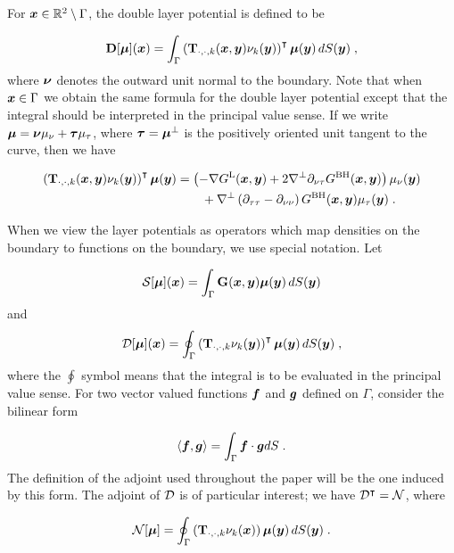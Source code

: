 For ${\boldsymbol x} \in \mathbb{R}^2 \setminus \Gamma$, the double layer
potential is defined to be

\begin{equation} \label{eq:doublelayer}
  {\bf D} [{\boldsymbol \mu}] ({\boldsymbol x}) = \int_\Gamma \left ( {\bf T}_{\cdot,\cdot,k}({\boldsymbol x},{\boldsymbol y})
  \nu_k({\boldsymbol y})\right )^\intercal {\boldsymbol \mu}({\boldsymbol y}) \, dS({\boldsymbol y}) \; ,
\end{equation}
where ${\boldsymbol \nu}$ denotes the outward unit normal to the boundary.
Note that when ${\boldsymbol x} \in \Gamma$ we obtain the same formula
for the double layer potential except that the integral should be
interpreted in the principal value sense. 
If we write ${\boldsymbol \mu} = {\boldsymbol \nu} \mu_\nu + {\boldsymbol \tau} \mu_\tau$,
where ${\boldsymbol \tau} = {\boldsymbol \mu}^\bot$ is the positively oriented unit
tangent to the curve, then we have

\begin{align} \label{eq:stokesdlkernel}
  \left ( {\bf T}_{\cdot,\cdot,k}({\boldsymbol x},{\boldsymbol y})\nu_k({\boldsymbol y}) \right )^\intercal
  {\boldsymbol \mu}({\boldsymbol y}) &= \left ( - \nabla G^{\textrm{L}}({\boldsymbol x},{\boldsymbol y}) + 2 \nabla^\bot
  \partial_{\nu\tau} G^{\textrm{BH}}({\boldsymbol x},{\boldsymbol y}) \right ) \mu_\nu({\boldsymbol y}) \nonumber \\
  & \qquad+
  \nabla^\bot \left (\partial_{\tau\tau}-\partial_{\nu\nu} \right )
  G^{\textrm{BH}}({\boldsymbol x},{\boldsymbol y}) \mu_\tau({\boldsymbol y}) \; .
\end{align}

When we view the layer potentials as
operators which map densities on the boundary to functions
on the boundary, we use special notation. Let

\begin{equation}
  {\mathcal S} [{\boldsymbol \mu}] ({\boldsymbol x}) = \int_\Gamma {\bf G} ({\boldsymbol x},{\boldsymbol y}) {\boldsymbol \mu}({\boldsymbol y})
  \, dS({\boldsymbol y})
\end{equation}
and
\begin{equation}
  {\mathcal D} [{\boldsymbol \mu}] ({\boldsymbol x}) = \oint_\Gamma \left ( {\bf T}_{\cdot,\cdot,k}\nu_k({\boldsymbol y})
  \right )^\intercal {\boldsymbol \mu}({\boldsymbol y}) \, dS({\boldsymbol y}) \; ,
\end{equation}
where the $\oint$ symbol means that the integral is to be
evaluated in the principal value sense. For two vector valued
functions ${\boldsymbol f}$ and ${\boldsymbol g}$ defined on $\Gamma$, consider the bilinear
form

\begin{equation} \label{eq:bi_form}
  \langle {\boldsymbol f} , {\boldsymbol g} \rangle = \int_\Gamma {\boldsymbol f} \cdot {\boldsymbol g} dS \; .
\end{equation}
The definition of the adjoint used throughout the paper will be
the one induced by this form.
The adjoint of ${\mathcal D}$ is of particular interest; we have
${\mathcal D}^\intercal = {\mathcal N}$, where

\begin{equation}
  {\mathcal N} [{\boldsymbol \mu}] = \oint_\Gamma \left ( {\bf T}_{\cdot,\cdot,k}\nu_k({\boldsymbol x})
  \right ) {\boldsymbol \mu}({\boldsymbol y}) \, dS({\boldsymbol y}) \; .
\end{equation}


